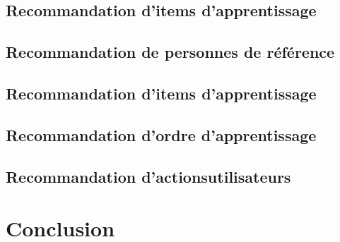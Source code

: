 \documentclass[conference]{./sty/IEEEtran}
\begin{document}
\subsection{Recommandation d'items d'apprentissage}
\subsection{Recommandation de personnes de référence}
\subsection{Recommandation d'items d'apprentissage}
\subsection{Recommandation d'ordre d'apprentissage}
\subsection{Recommandation d'actionsutilisateurs}


\section{Conclusion}




\end{document}
